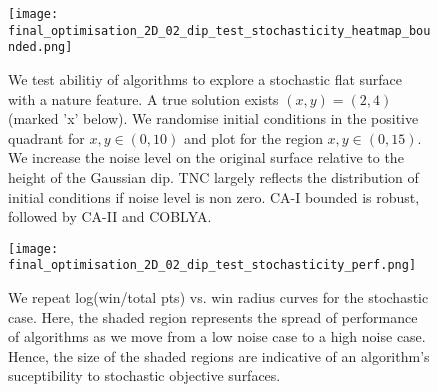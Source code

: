 \begin{figure}[h!]
	\centering
	\caption[Optimisation Routines: Algorithm Search on 2D Flat Surface with Noise - Heatmap of Optimisation Results]{ We test abilitiy of algorithms to explore a stochastic flat surface with a nature feature. A true solution exists $(x,y)=(2,4)$ (marked 'x' below). We randomise initial conditions in the positive quadrant for $x,y \in (0, 10)$ and plot for the region $x,y \in (0, 15)$. We increase the noise level on the original surface relative to the height of the Gaussian dip. TNC largely reflects the distribution of initial conditions if noise level is non zero. CA-I bounded is robust, followed by CA-II and COBLYA.} 
	\texttt{[image: final\_optimisation\_2D\_02\_dip\_test\_stochasticity\_heatmap\_bounded.png]} \label{fig:final_optimisation_2D_02_dip_test_stochasticity_heatmap_bounded}
\end{figure}
\FloatBarrier
\begin{figure}[h!]
	\centering
	\caption[Optimisation Routines: Algorithm Search on 2D Flat Surface with Noise - Performance Results]{We repeat log(win/total pts) vs. win radius curves for the stochastic case. Here, the shaded region represents the spread of performance of algorithms as we move from a low noise case to a high noise case. Hence, the size of the shaded regions are indicative of an algorithm's suceptibility to stochastic objective surfaces.} 
	\texttt{[image: final\_optimisation\_2D\_02\_dip\_test\_stochasticity\_perf.png]} \label{fig:final_optimisation_2D_02_dip_test_stochasticity_perf}
\end{figure}